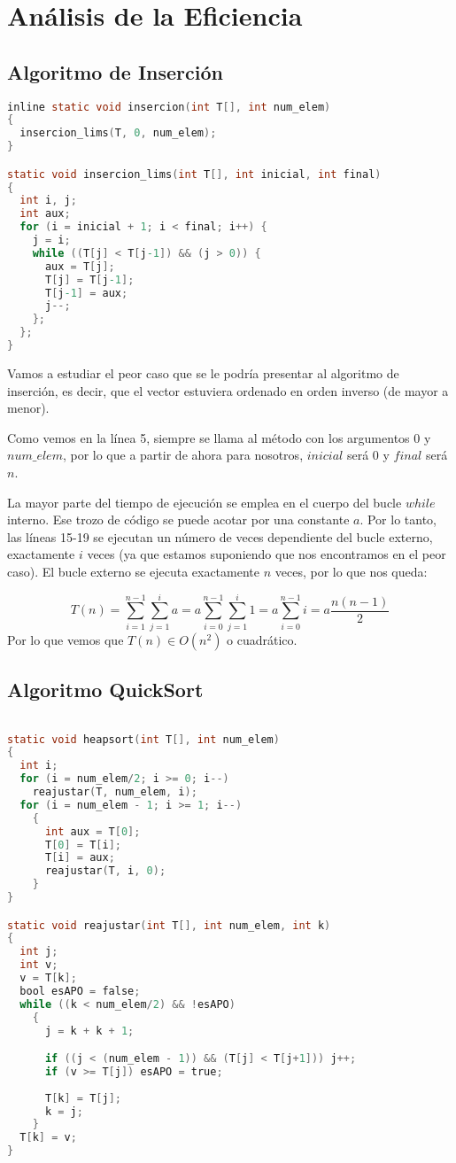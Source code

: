 \section{Análisis de la Eficiencia}


\subsection{Algoritmo de Inserción}
\begin{lstlisting}[language=C]
inline static void insercion(int T[], int num_elem)
{
  insercion_lims(T, 0, num_elem);
}

static void insercion_lims(int T[], int inicial, int final)
{
  int i, j;
  int aux;
  for (i = inicial + 1; i < final; i++) {
    j = i;
    while ((T[j] < T[j-1]) && (j > 0)) {
      aux = T[j];
      T[j] = T[j-1];
      T[j-1] = aux;
      j--;
    };
  };
}
\end{lstlisting}

Vamos a estudiar el peor caso que se le podría presentar al algoritmo de inserción, es decir, que el vector estuviera ordenado en orden inverso (de mayor a menor).

Como vemos en la línea 5, siempre se llama al método con los argumentos $0$ y $num\_elem$, por lo que a partir de ahora para nosotros, $inicial$ será $0$ y $final$ será $n$.

La mayor parte del tiempo de ejecución se emplea en el cuerpo del bucle $while$ interno. Ese trozo de código se puede acotar por una constante $a$. Por lo tanto, las líneas 15-19 se ejecutan un número de veces dependiente del bucle externo, exactamente $i$ veces (ya que estamos suponiendo que nos encontramos en el peor caso). El bucle externo se ejecuta exactamente $n$ veces, por lo que nos queda:

\[T(n)=\sum_{i=1}^{n-1}\sum_{j=1}^{i}a=a\sum_{i=0}^{n-1}\sum_{j=1}^{i}1=a\sum_{i=0}^{n-1}i=a\frac{n(n-1)}{2}\]
Por lo que vemos que $T(n)\in O(n^2)$ o cuadrático.

\subsection{Algoritmo QuickSort}
\begin{lstlisting}[language=C]

static void heapsort(int T[], int num_elem)
{
  int i;
  for (i = num_elem/2; i >= 0; i--)
    reajustar(T, num_elem, i);
  for (i = num_elem - 1; i >= 1; i--)
    {
      int aux = T[0];
      T[0] = T[i];
      T[i] = aux;
      reajustar(T, i, 0);
    }
} 

static void reajustar(int T[], int num_elem, int k)
{
  int j;
  int v;
  v = T[k];
  bool esAPO = false;
  while ((k < num_elem/2) && !esAPO)
    {
      j = k + k + 1;

      if ((j < (num_elem - 1)) && (T[j] < T[j+1])) j++;
      if (v >= T[j]) esAPO = true;
      
      T[k] = T[j];
      k = j;
    }
  T[k] = v;
}
\end{lstlisting}

